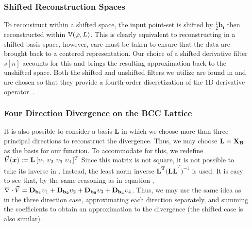 \subsubsection{Shifted Reconstruction Spaces}
To reconstruct within a shifted space, the input point-set is shifted by $\frac{1}{2}\mathbf{b_i}$ then reconstructed within $\mathbb{V}(\varphi, L)$. This is clearly equivalent to reconstructing in a shifted basis space, however, care must be taken to ensure that the data are brought back to a centered representation. Our choice of a shifted derivative filter $s[n]$ accounts for this and brings the resulting approximation back to the unshifted space. Both the shifted and unshifted filters we utilize are found in  and are chosen so that they provide a fourth-order discretization of the 1D derivative operator~\cite{gradrev}. 

\subsubsection{Four Direction Divergence on the BCC Lattice}
It is also possible to consider a basis $\mathbf{L}$ in which we choose more than three principal directions to reconstruct the divergence. Thus, we may choose $\mathbf{L} = \mathbf{\mathbf{X}_{B}} $ as the basis for our function. To accommodate for this, we redefine $\vec{V}(\vx):=\mathbf{L} \left[\upsilon_1 \ \upsilon_2 \ \upsilon_3 \ \upsilon_4 \right.]^T$ Since this matrix is not square, it is not possible to take its inverse in . Instead, the least norm inverse $\mathbf{L^T(LL}^T\mathbf{)}^{-1}$ is used. It is easy to see that, by the same reasoning as in equation , $\nabla \cdot \vec{V} = \mathbf{D}_{\mathbf{b_1}}\upsilon_1 + \mathbf{D}_{\mathbf{b_2}}\upsilon_2 + \mathbf{D}_{\mathbf{b_3}}\upsilon_3 + \mathbf{D}_{\mathbf{b_4}}\upsilon_4$. Thus, we may use the same idea as in the three direction case, approximating each direction separately, and summing the coefficients to obtain an approximation to the divergence (the shifted case is also similar).
